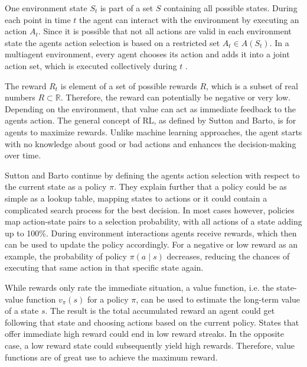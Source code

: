One environment state $S_t$ is part of a set $S$ containing all possible states. During each point in time $t$ the agent can interact with the environment by executing an action $A_t$. Since it is possible that not all actions are valid in each environment state the agents action selection is based on a restricted set $A_t\in A(S_t)$. In a multiagent environment, every agent chooses its action and adds it into a joint action set, which is executed collectively during $t$ \cite{buba10}.

The reward $R_t$ is element of a set of possible rewards $R$, which is a subset of real numbers $R \subset \mathbb{R}$. Therefore, the reward can potentially be negative or very low. Depending on the environment, that value can act as immediate feedback to the agents action. The general concept of RL, as defined by Sutton and Barto, is for agents to maximize rewards. Unlike machine learning approaches, the agent starts with no knowledge about good or bad actions and enhances the decision-making over time.

Sutton and Barto continue by defining the agents action selection with respect to the current state as a policy $\pi$. They explain further that a policy could be as simple as a lookup table, mapping states to actions or it could contain a complicated search process for the best decision.
In most cases however, policies map action-state pairs to a selection probability, with all actions of a state adding up to 100\%.
During environment interactions agents receive rewards, which then can be used to update the policy accordingly. For a negative or low reward as an example, the probability of policy $\pi(a \mid s)$ decreases, reducing the chances of executing that same action in that specific state again.

While rewards only rate the immediate situation, a value function, i.e. the state-value function $v_{\pi}(s)$ for a policy $\pi$, can be used to estimate the long-term value of a state $s$. The result is the total accumulated reward an agent could get following that state and choosing actions based on the current policy. States that offer immediate high reward could end in
low reward streaks. In the opposite case, a low reward state could subsequently yield high rewards. Therefore, value functions are of great use to achieve the maximum reward.

